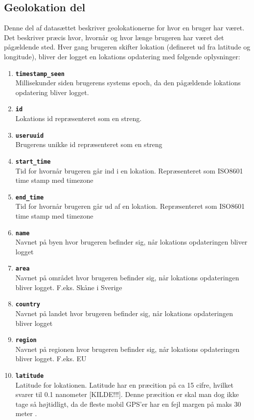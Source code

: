 \subsection{Geolokation del}
Denne del af datasættet beskriver geolokationerne for hvor en bruger har været. Det beskriver præcis hvor, hvornår og hvor længe brugeren har været det pågældende sted. Hver gang brugeren skifter lokation (defineret ud fra latitude og longitude), bliver der logget en lokations opdatering med følgende oplysninger:
\begin{enumerate}
\item \texttt{\textbf{timestamp\_seen}}\\Millisekunder siden brugerens systems epoch, da den pågældende lokations opdatering bliver logget. 
\item \texttt{\textbf{id}}\\Lokations id repræsenteret som en streng. 
\item \texttt{\textbf{useruuid}}\\Brugerens unikke id repræsenteret som en streng
\item \texttt{\textbf{start\_time}}\\Tid for hvornår brugeren går ind i en lokation. Repræsenteret som ISO8601 time stamp med timezone
\item \texttt{\textbf{end\_time}}\\Tid for hvornår brugeren går ud af en lokation. Repræsenteret som ISO8601 time stamp med timezone
\item \texttt{\textbf{name}}\\Navnet på byen hvor brugeren befinder sig, når lokations opdateringen bliver logget
\item \texttt{\textbf{area}}\\Navnet på området hvor brugeren befinder sig, når lokations opdateringen bliver logget. F.eks. Skåne i Sverige
\item \texttt{\textbf{country}}\\Navnet på landet hvor brugeren befinder sig, når lokations opdateringen bliver logget
\item \texttt{\textbf{region}}\\Navnet på regionen hvor brugeren befinder sig, når lokations opdateringen bliver logget. F.eks. EU
\item \texttt{\textbf{latitude}}\\Latitude for lokationen. Latitude har en præcition på ca 15 cifre, hvilket svarer til 0.1 nanometer [KILDE!!!]. Denne præcition er skal man dog ikke tage så højtidligt, da de fleste mobil GPS'er har en fejl margen på maks 30 meter \cite{NAV:8292634}.  

\end{enumerate}
